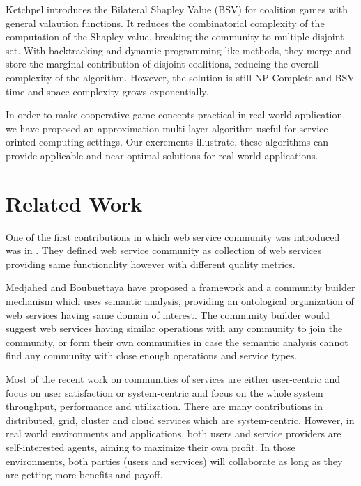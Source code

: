         Ketchpel introduces the Bilateral Shapley Value (BSV)\cite{conf/aaai/Ketchpel94a} for coalition games with general valaution functions.
        It reduces the combinatorial complexity of the computation of the Shapley value, breaking the community to multiple disjoint set.
        With backtracking and dynamic programming like methods, they merge and store the marginal contribution of disjoint coalitions,
        reducing the overall complexity of the algorithm. However, the solution is still NP-Complete and BSV time and space complexity grows exponentially.

        In order to make cooperative game concepts practical in real world application, we have proposed an approximation multi-layer
        algorithm useful for service orinted computing settings. Our excrements illustrate, these algorithms can provide
        applicable and near optimal solutions for real world applications.


    \section{Related Work}\label{sec:BRRelatedWork}

        One of the first contributions in which web service community was introduced was in \cite{Zeng:2003:QDW:775152.775211}. They defined web service community as collection of web services providing same functionality however with different quality metrics.

        Medjahed and Boubuettaya \cite{journals/dpd/MedjahedB05} have proposed a framework and a community builder mechanism which uses semantic analysis, providing an ontological organization of web services having same domain of interest. The community builder would suggest web services having similar operations with any community to join the community, or form their own communities in case the semantic analysis cannot find any community with close enough operations and service types.

        Most of the recent work on communities of services are either
        user-centric and focus on user satisfaction
        \cite{Chun02user-centricperformance} or system-centric and focus
        on the whole system throughput, performance and utilization. There
        are many contributions in distributed, grid, cluster and cloud
        services which are system-centric. However, in real world
        environments and applications, both users and service providers
        are self-interested agents, aiming to maximize their own profit.
        In those environments, both parties (users and services) will
        collaborate as long as they are getting more benefits and payoff.


